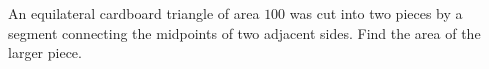 An equilateral cardboard triangle of area $100$ was cut into two pieces by a segment connecting the midpoints of two adjacent sides. Find the area of the larger piece.
